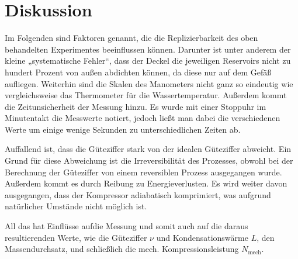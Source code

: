 \section{Diskussion}
\label{sec:Diskussion}

Im Folgenden sind Faktoren genannt, die die Replizierbarkeit des oben behandelten Experimentes beeinflussen können.
Darunter ist unter anderem der kleine „systematische Fehler“, dass der Deckel die jeweiligen Reservoirs nicht
zu hundert Prozent von außen abdichten können, da diese nur auf dem Gefäß aufliegen.
Weiterhin sind die Skalen des Manometers nicht ganz so eindeutig wie vergleichsweise das Thermometer für die Wassertemperatur.
Außerdem kommt die Zeitunsicherheit der Messung hinzu.
Es wurde mit einer Stoppuhr im Minutentakt die Messwerte notiert, jedoch ließt man dabei die verschiedenen Werte
um einige wenige Sekunden zu unterschiedlichen Zeiten ab.

Auffallend ist, dass die Güteziffer stark von der idealen Güteziffer abweicht. Ein Grund für diese
Abweichung ist die Irreversibilität des Prozesses, obwohl bei der Berechnung der Güteziffer von
einem reversiblen Prozess ausgegangen wurde. Außerdem kommt es durch Reibung zu Energieverlusten.
Es wird weiter davon ausgegangen, dass der Kompressor adiabatisch komprimiert, was aufgrund natürlicher
Umstände nicht möglich ist.

All das hat Einflüsse aufdie Messung und somit auch auf die daraus resultierenden Werte, 
wie die Güteziffer $\nu$ und Kondensationswärme $L$, den Massendurchsatz, und schließlich die mech. Kompressionsleistung $N_\text{mech}$.